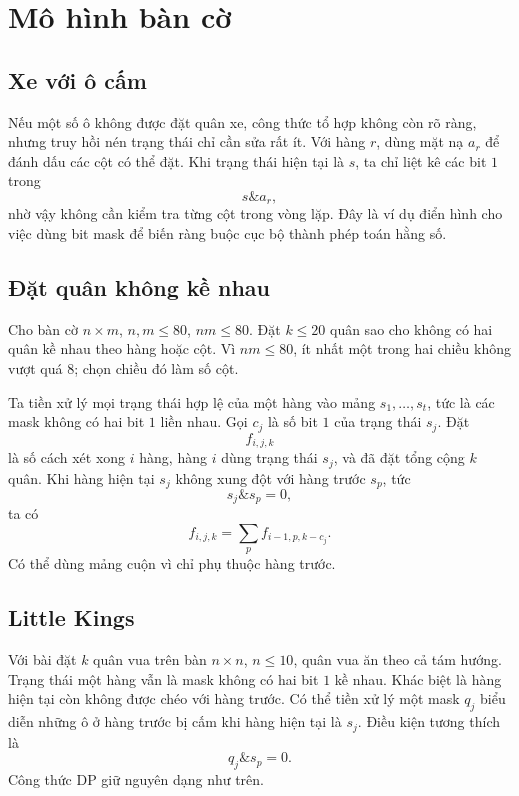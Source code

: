\documentclass[11pt]{article}
\begin{document}
\section{Mô hình bàn cờ}

\subsection{Xe với ô cấm}

Nếu một số ô không được đặt quân xe, công thức tổ hợp không còn rõ ràng, nhưng
truy hồi nén trạng thái chỉ cần sửa rất ít. Với hàng \(r\), dùng mặt nạ
\(a_r\) để đánh dấu các cột có thể đặt. Khi trạng thái hiện tại là \(s\), ta
chỉ liệt kê các bit \(1\) trong
\[
  s\mathbin{\&} a_r,
\]
nhờ vậy không cần kiểm tra từng cột trong vòng lặp. Đây là ví dụ điển hình
cho việc dùng bit mask để biến ràng buộc cục bộ thành phép toán hằng số.

\subsection{Đặt quân không kề nhau}

Cho bàn cờ \(n\times m\), \(n,m\le 80\), \(nm\le 80\). Đặt \(k\le 20\) quân
sao cho không có hai quân kề nhau theo hàng hoặc cột. Vì \(nm\le 80\), ít
nhất một trong hai chiều không vượt quá \(8\); chọn chiều đó làm số cột.

Ta tiền xử lý mọi trạng thái hợp lệ của một hàng vào mảng \(s_1,\ldots,s_t\),
tức là các mask không có hai bit \(1\) liền nhau. Gọi \(c_j\) là số bit \(1\)
của trạng thái \(s_j\). Đặt
\[
  f_{i,j,k}
\]
là số cách xét xong \(i\) hàng, hàng \(i\) dùng trạng thái \(s_j\), và đã đặt
tổng cộng \(k\) quân. Khi hàng hiện tại \(s_j\) không xung đột với hàng trước
\(s_p\), tức
\[
  s_j\mathbin{\&}s_p=0,
\]
ta có
\[
  f_{i,j,k}=\sum_p f_{i-1,p,k-c_j}.
\]
Có thể dùng mảng cuộn vì chỉ phụ thuộc hàng trước.

\subsection{Little Kings}

Với bài đặt \(k\) quân vua trên bàn \(n\times n\), \(n\le 10\), quân vua ăn
theo cả tám hướng. Trạng thái một hàng vẫn là mask không có hai bit \(1\) kề
nhau. Khác biệt là hàng hiện tại còn không được chéo với hàng trước. Có thể
tiền xử lý một mask \(q_j\) biểu diễn những ô ở hàng trước bị cấm khi hàng
hiện tại là \(s_j\). Điều kiện tương thích là
\[
  q_j\mathbin{\&}s_p=0.
\]
Công thức DP giữ nguyên dạng như trên.
\end{document}
